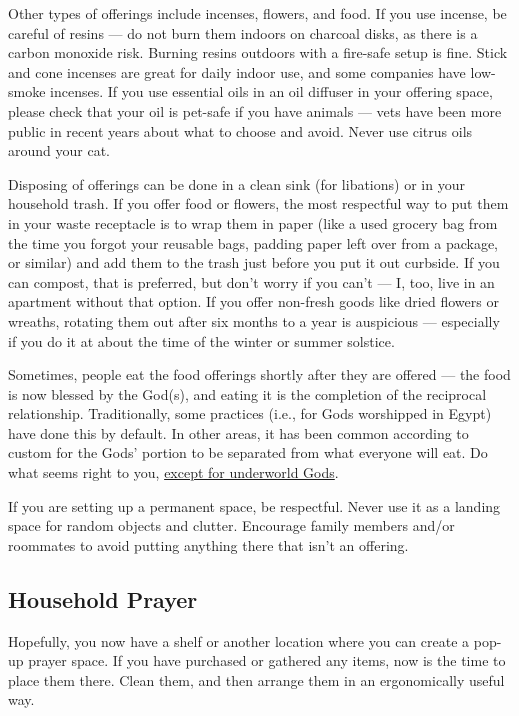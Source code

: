 \documentclass[
]{book}
\begin{document}
Other types of offerings include incenses, flowers, and food. If you use incense, be careful of resins --- do not burn them indoors on charcoal disks, as there is a carbon monoxide risk. Burning resins outdoors with a fire-safe setup is fine. Stick and cone incenses are great for daily indoor use, and some companies have low-smoke incenses. If you use essential oils in an oil diffuser in your offering space, please check that your oil is pet-safe if you have animals --- vets have been more public in recent years about what to choose and avoid. Never use citrus oils around your cat.

Disposing of offerings can be done in a clean sink (for libations) or in your household trash. If you offer food or flowers, the most respectful way to put them in your waste receptacle is to wrap them in paper (like a used grocery bag from the time you forgot your reusable bags, padding paper left over from a package, or similar) and add them to the trash just before you put it out curbside. If you can compost, that is preferred, but don't worry if you can't --- I, too, live in an apartment without that option. If you offer non-fresh goods like dried flowers or wreaths, rotating them out after six months to a year is auspicious --- especially if you do it at about the time of the winter or summer solstice.

Sometimes, people eat the food offerings shortly after they are offered --- the food is now blessed by the God(s), and eating it is the completion of the reciprocal relationship. Traditionally, some practices (i.e., for Gods worshipped in Egypt) have done this by default. In other areas, it has been common according to custom for the Gods' portion to be separated from what everyone will eat. Do what seems right to you, \protect\hyperlink{underworld}{except for underworld Gods}.

If you are setting up a permanent space, be respectful. Never use it as a landing space for random objects and clutter. Encourage family members and/or roommates to avoid putting anything there that isn't an offering.

\hypertarget{household-prayer}{%
\subsection{Household Prayer}\label{household-prayer}}

Hopefully, you now have a shelf or another location where you can create a pop-up prayer space. If you have purchased or gathered any items, now is the time to place them there. Clean them, and then arrange them in an ergonomically useful way.
\end{document}
